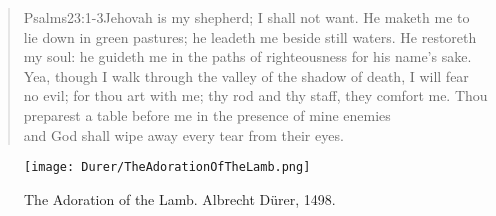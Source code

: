 \begin{verse}
				{Psalms}{23:1-3}{Jehovah is my shepherd; I shall not want. He maketh me to lie down in green pastures; he leadeth me beside still waters. He restoreth my soul: he guideth me in the paths of righteousness for his name’s sake. Yea, though I walk through the valley of the shadow of death, I will fear no evil; for thou art with me; thy rod and thy staff, they comfort me. Thou preparest a table before me in the presence of mine enemies}\\
 and God shall wipe away every tear from their eyes.%
\end{verse}
\begin{figure*}[p]
  	\centering
  	\texttt{[image: Durer/TheAdorationOfTheLamb.png]}
  	\caption[The Adoration of the Lamb]{The Adoration of the Lamb. Albrecht Dürer, 1498.}
  \end{figure*}
